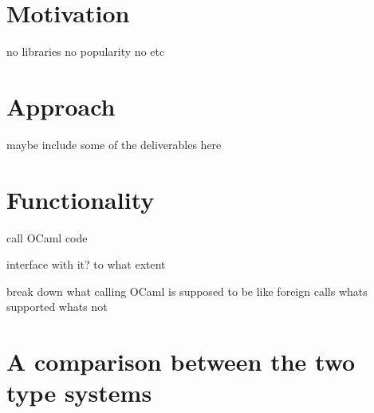 \section{Motivation}
no libraries no popularity no etc



\section{Approach}

maybe include some of the deliverables here

\section{Functionality}

call OCaml code

interface with it? to what extent

break down what calling OCaml is supposed to be like
foreign calls whats supported whats not

\section{A comparison between the two type systems}